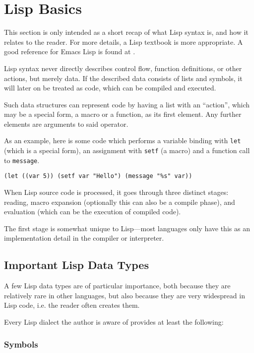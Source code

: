 \documentclass[a4paper,10pt,twoside]{report}
\newcommand{\el}{Emacs Lisp}
\newcommand{\fun}[1]{\texttt{#1}}
\begin{document}
\chapter{Lisp Basics}
\label{subsec:lisp-basics}

This section is only intended as a short recap of what Lisp syntax is, and how
it relates to the reader.  For more details, a Lisp textbook is more
appropriate.  A good reference for \el{} is found at \cite{elisp-reference}.

Lisp syntax never directly describes control flow, function definitions, or
other actions, but merely data.  If the described data consists of lists and
symbols, it will later on be treated as code, which can be compiled and
executed.

Such data structures can represent code by having a list with an ``action'',
which may be a special form, a macro or a function, as its first element.  Any
further elements are arguments to said operator.

As an example, here is some code which performs a variable binding with
\fun{let} (which is a special form), an assignment with \fun{setf} (a macro)
and a function call to \fun{message}.

\begin{lstlisting}[style=lispinline]
  (let ((var 5)) (setf var "Hello") (message "%s" var))
\end{lstlisting}

When Lisp source code is processed, it goes through three distinct stages:
reading, macro expansion (optionally this can also be a compile phase), and
evaluation (which can be the execution of compiled code).

The first stage is somewhat unique to Lisp---most languages only have this as an
implementation detail in the compiler or interpreter.

\section{Important Lisp Data Types}
\label{subsec:important-types}

A few Lisp data types are of particular importance, both because they are
relatively rare in other languages, but also because they are very widespread in
Lisp code, i.e. the reader often creates them.

Every Lisp dialect the author is aware of provides at least the following:

\subsection{Symbols}
\label{subsubsec:symbols}
\end{document}
